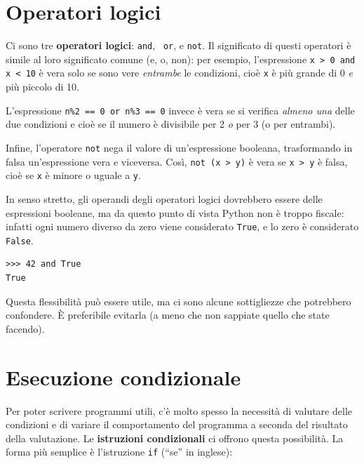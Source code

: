 \documentclass[10pt]{book}
\begin{document}
\section {Operatori logici}

Ci sono tre {\bf operatori logici}: {\tt and}, {\tt
or}, e {\tt not}.  Il significato di questi operatori è simile al loro significato comune (e, o, non): per esempio, l'espressione {\tt x > 0 and x < 10} è vera solo se sono vere {\em entrambe} le condizioni, cioè {\tt x} è più grande di 0 {\em e} più piccolo di 10.

L'espressione {\tt n\%2 == 0 or n\%3 == 0} invece è vera se si verifica {\em almeno una} delle due condizioni e cioè se il numero è divisibile per 2 {\em o} per 3 (o per entrambi).

Infine, l'operatore {\tt not} nega il valore di un'espressione booleana,
trasformando in falsa un'espressione vera e viceversa. Così, {\tt not (x > y)} è vera se {\tt x > y} è falsa, cioè se {\tt x} è minore o uguale a {\tt y}.

In senso stretto, gli operandi degli operatori logici dovrebbero essere delle espressioni booleane, ma da questo punto di vista Python non è troppo fiscale: infatti ogni numero diverso da zero viene considerato {\tt True}, e lo zero è considerato {\tt False}.

\begin{verbatim}
>>> 42 and True
True
\end{verbatim}
%
Questa flessibilità può essere utile, ma ci sono alcune sottigliezze che potrebbero confondere. È preferibile evitarla (a meno che non sappiate quello che state facendo).


\section{Esecuzione condizionale}
\label{conditional.execution}

Per poter scrivere programmi utili, c'è molto spesso la necessità di valutare delle condizioni e di variare il comportamento del programma a seconda del risultato della valutazione. Le {\bf istruzioni condizionali} ci offrono questa possibilità. La forma più semplice è l'istruzione {\tt if} (``se'' in inglese):
\end{document}
